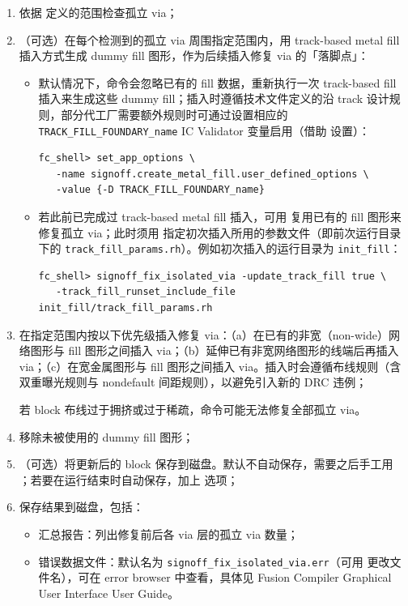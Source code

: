 \begin{enumerate}
  \item 依据  定义的范围检查孤立 via；
  \item （可选）在每个检测到的孤立 via 周围指定范围内，用 track-based metal fill 插入方式生成 dummy fill 图形，作为后续插入修复 via 的「落脚点」：
        \begin{itemize}
          \item 默认情况下，命令会忽略已有的 fill 数据，重新执行一次 track-based fill 插入来生成这些 dummy fill；插入时遵循技术文件定义的沿 track 设计规则，部分代工厂需要额外规则时可通过设置相应的 \texttt{TRACK\_FILL\_FOUNDARY\_name} IC Validator 变量启用（借助  设置）：
\begin{lstlisting}
fc_shell> set_app_options \
   -name signoff.create_metal_fill.user_defined_options \
   -value {-D TRACK_FILL_FOUNDARY_name}
\end{lstlisting}
          \item 若此前已完成过 track-based metal fill 插入，可用  复用已有的 fill 图形来修复孤立 via；此时须用  指定初次插入所用的参数文件（即前次运行目录下的 \texttt{track\_fill\_params.rh}）。例如初次插入的运行目录为 \texttt{init\_fill}：
\begin{lstlisting}
fc_shell> signoff_fix_isolated_via -update_track_fill true \
   -track_fill_runset_include_file init_fill/track_fill_params.rh
\end{lstlisting}
        \end{itemize}
  \item 在指定范围内按以下优先级插入修复 via：（a）在已有的非宽（non-wide）网络图形与 fill 图形之间插入 via；（b）延伸已有非宽网络图形的线端后再插入 via；（c）在宽金属图形与 fill 图形之间插入 via。插入时会遵循布线规则（含双重曝光规则与 nondefault 间距规则），以避免引入新的 DRC 违例；
        \begin{noteBox}
        若 block 布线过于拥挤或过于稀疏，命令可能无法修复全部孤立 via。
        \end{noteBox}
  \item 移除未被使用的 dummy fill 图形；
  \item （可选）将更新后的 block 保存到磁盘。默认不自动保存，需要之后手工用 ；若要在运行结束时自动保存，加上  选项；
  \item 保存结果到磁盘，包括：
        \begin{itemize}
          \item 汇总报告：列出修复前后各 via 层的孤立 via 数量；
          \item 错误数据文件：默认名为 \texttt{signoff\_fix\_isolated\_via.err}（可用  更改文件名），可在 error browser 中查看，具体见 Fusion Compiler Graphical User Interface User Guide。
        \end{itemize}
\end{enumerate}

